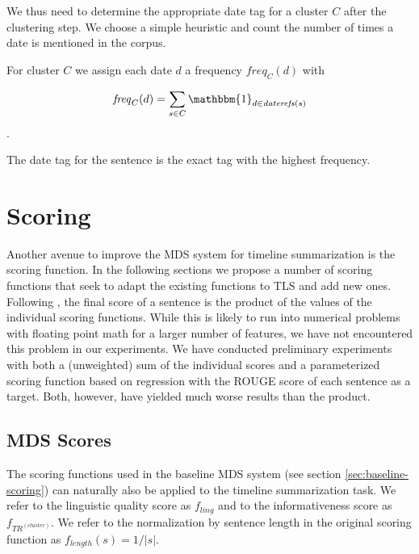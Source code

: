\documentclass[a4paper,BCOR=10mm]{report}
\numberwithin{lemma}{chapter}
\numberwithin{definition}{chapter}
\begin{document}
We thus need to determine the appropriate date tag for a cluster $C$ after the clustering step. We choose a simple heuristic and count the number of times a date is mentioned in the corpus.

For cluster $C$ we assign each date $d$ a frequency $\mathit{freq}_C(d)$ with

\begin{equation}
\mathit{freq}_C(d) = \sum_{s \in C} \mathbbm{1}_{d \in \mathit{daterefs}(s)}
\end{equation}.

The date tag for the sentence is the exact tag with the highest frequency.



\section{Scoring} \label{sec:scoring}

Another avenue to improve the MDS system for timeline summarization is the scoring function.
In the following sections we propose a number of scoring functions that seek to adapt the existing functions to TLS and add new ones.
Following \citet{banerjee}, the final score of a sentence is the product of the values of the individual scoring functions.
While this is likely to run into numerical problems with floating point math for a larger number of features, we have not encountered this problem in our experiments.
We have conducted preliminary experiments with both a (unweighted) sum of the individual scores and a parameterized scoring function based on regression with the ROUGE score of each sentence as a target. Both, however, have yielded much worse results than the product.

\subsection{MDS Scores} \label{sec:mds-scores}

The scoring functions used in the baseline MDS system (see section \ref{sec:baseline-scoring}) can naturally also be applied to the timeline summarization task.
We refer to the linguistic quality score as $f_{ling}$ and to the informativeness score as $f_{TR^{(cluster)}}$.
We refer to the normalization by sentence length in the original scoring function as $f_{length}(s) = 1 / |s|$.
\end{document}
